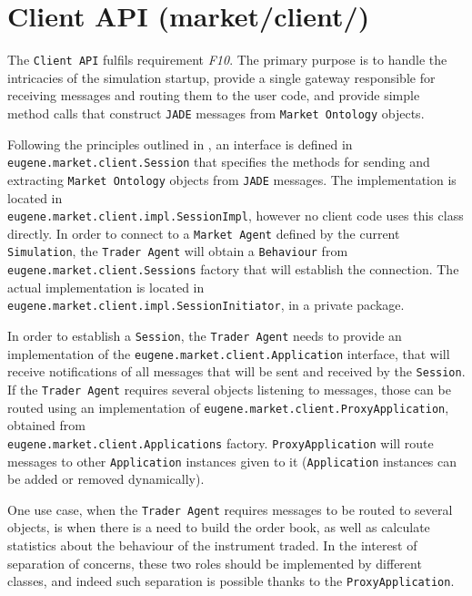 \section{Client API (market/client/)}
\label{Chapters/Background/Client-API}
The \texttt{Client API} fulfils requirement \textit{F10}. The primary purpose is to handle the intricacies of the simulation startup, provide  a single gateway responsible for receiving messages and routing them to the user code, and provide simple method calls that construct \texttt{JADE} messages from \texttt{Market Ontology} objects.

Following the principles outlined in , an interface is defined in \\ \texttt{eugene.market.client.Session} that specifies the methods for sending   and extracting \texttt{Market Ontology} objects from \texttt{JADE} messages. The implementation is located in \\\texttt{eugene.market.client.impl.SessionImpl}, however no client code uses this class directly. In order to connect to a \texttt{Market Agent} defined by the current \texttt{Simulation}, the \texttt{Trader Agent} will obtain a \texttt{Behaviour} from \texttt{eugene.market.client.Sessions} factory that will establish the connection. The actual implementation is located in \texttt{eugene.market.client.impl.SessionInitiator}, in a private package. 

In order to establish a \texttt{Session}, the \texttt{Trader Agent} needs to provide an implementation of the \texttt{eugene.market.client.Application} interface, that will receive notifications of all messages that will be sent and received by the \texttt{Session}. If the \texttt{Trader Agent} requires several objects listening to messages, those can be routed using an implementation of \texttt{eugene.market.client.ProxyApplication}, obtained from \\\texttt{eugene.market.client.Applications} factory. \texttt{ProxyApplication} will route messages to other \texttt{Application} instances given to it (\texttt{Application} instances can be added or removed dynamically).

One use case, when the \texttt{Trader Agent} requires messages to be routed to several objects, is when there is a need to build the order book, as well as calculate statistics about the behaviour of the instrument traded. In the interest of separation of concerns, these two roles should be implemented by different classes, and indeed such separation is possible thanks to the \texttt{ProxyApplication}.


